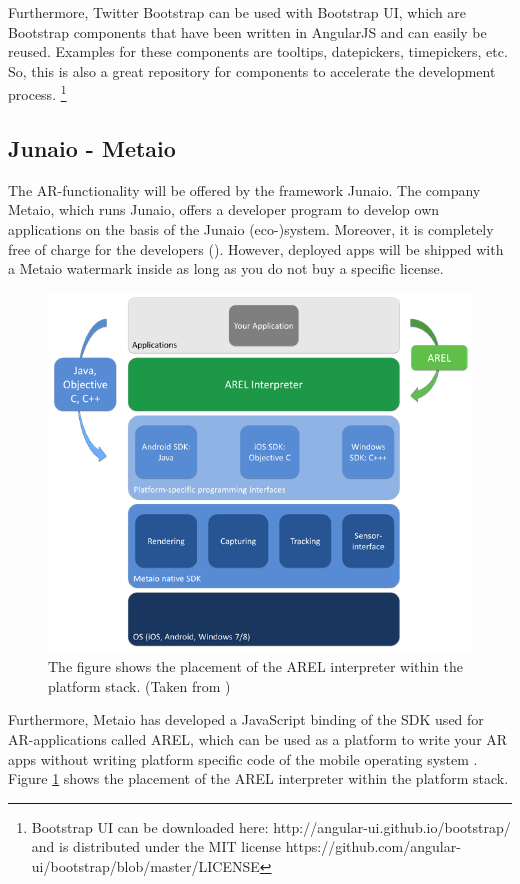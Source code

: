 Furthermore, Twitter Bootstrap can be used with Bootstrap UI, which are Bootstrap components that have been written in AngularJS and can easily be reused. Examples for these components are tooltips, datepickers, timepickers, etc. So, this is also a great repository for components to accelerate the development process. \footnote{Bootstrap UI can be downloaded here: http://angular-ui.github.io/bootstrap/ and is distributed under the MIT license https://github.com/angular-ui/bootstrap/blob/master/LICENSE}

\subsection{Junaio - Metaio}
\label{AREL}
The \ac{AR}-functionality will be offered by the framework Junaio. The company Metaio, which runs Junaio, offers a developer program to develop own applications on the basis of the Junaio (eco-)system. Moreover, it is completely free of charge for the developers (\cite{junaio1}). However, deployed apps will be shipped with a Metaio watermark inside as long as you do not buy a specific license. 

\begin{figure}[th]
\centerline{\includegraphics[width=.7\textwidth]{gfx/stackAREL}}
\caption{The figure shows the placement of the AREL interpreter within the platform stack. (Taken from \cite{MetaioDEV})}
\label{stackArel}
\end{figure}

Furthermore, Metaio has developed a JavaScript binding of the SDK used for \ac{AR}-applications called \ac{AREL}, which can be used as a platform to write your \ac{AR} apps without writing platform specific code of the mobile operating system \cite{MetaioDEV}. Figure \ref{stackArel} shows the placement of the \ac{AREL} interpreter within the platform stack. 

